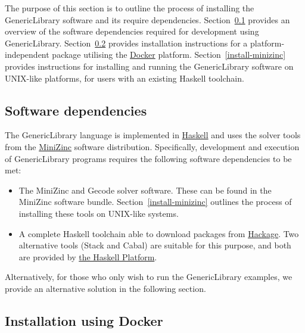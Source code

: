 
The purpose of this section is to outline the process of installing
the GenericLibrary software and its require dependencies.
%
Section~\ref{install-overview} provides an overview of the software
dependencies required for development using GenericLibrary.
%
Section~\ref{install-docker} provides installation instructions for a
platform-independent package utilising the
\href{https://www.docker.com/}{Docker}
platform.
%
Section~\ref{install-minizinc} provides instructions for installing
and running the GenericLibrary software on UNIX-like platforms, for
users with an existing Haskell toolchain.


\subsection{Software dependencies}
\label{install-overview}

The GenericLibrary language is implemented in
\href{https://www.haskell.org/}{Haskell} and uses the solver tools
from the \href{http://www.minizinc.org/}{MiniZinc} software
distribution.
%
Specifically, development and execution of GenericLibrary programs
requires the following software dependencies to be met:

\begin{itemize}
\item The MiniZinc and Gecode solver software.
%
  These can be found in the MiniZinc software bundle.
%
  Section~\ref{install-minizinc} outlines the process of installing
  these tools on UNIX-like systems.
\item A complete Haskell toolchain able to download packages from
  \href{https://hackage.haskell.org/}{Hackage}.
%
  Two alternative tools (Stack and Cabal) are suitable for this
  purpose, and both are provided by
  \href{https://www.haskell.org/platform/}{the Haskell Platform}.
\end{itemize}

Alternatively, for those who only wish to run the GenericLibrary
examples, we provide an alternative solution in the following section.


\subsection{Installation using Docker}
\label{install-docker}

